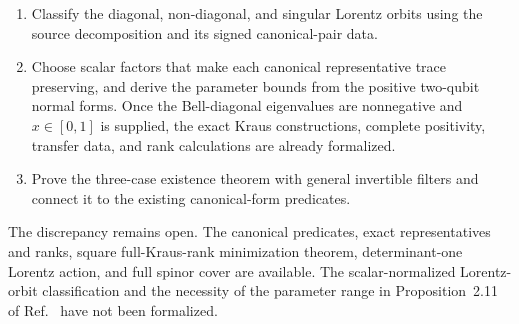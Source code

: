 \documentclass{article}
\begin{document}
\begin{enumerate}
    \item Classify the diagonal, non-diagonal, and singular Lorentz orbits
    using the source decomposition and its signed canonical-pair data.

    \item Choose scalar factors that make each canonical representative trace
    preserving, and derive the parameter bounds from the positive two-qubit
    normal forms. Once the Bell-diagonal eigenvalues are nonnegative and
    $x\in[0,1]$ is supplied, the exact Kraus constructions, complete
    positivity, transfer data, and rank calculations are already formalized.

    \item Prove the three-case existence theorem with general invertible
    filters and connect it to the existing canonical-form predicates.
\end{enumerate}

The discrepancy remains open. The canonical predicates, exact representatives
and ranks, square full-Kraus-rank minimization theorem, determinant-one
Lorentz action, and full spinor cover are available. The scalar-normalized
Lorentz-orbit classification and the necessity of the parameter range in
Proposition~2.11 of Ref.~\cite{Wolf2012Quantum} have not been formalized.



\end{document}
